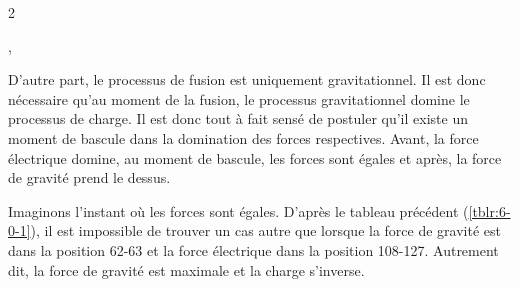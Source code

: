 \begin{multicols}{2}
\begin{table}[H]
		\centering
		\caption{\footnotesize{\textbf{Charge vs masse}}}
		\label{tblr:6-0-1},
\end{table}


D'autre part, le processus de fusion est uniquement gravitationnel. Il
est donc nécessaire qu'au moment de la fusion, le processus
gravitationnel domine le processus de charge. Il est donc tout à fait
sensé de postuler qu'il existe un moment de bascule dans la domination
des forces respectives. Avant, la force électrique domine, au moment
de bascule, les forces sont égales et après, la force de gravité
prend le dessus.

Imaginons l'instant où les forces sont égales. D'après le tableau
précédent (\ref{tblr:6-0-1}), il est impossible de trouver un cas autre que lorsque la
force de gravité est dans la position 62-63 et la force électrique
dans la position 108-127. Autrement dit, la force de gravité est
maximale et la charge s'inverse.


\end{multicols}
